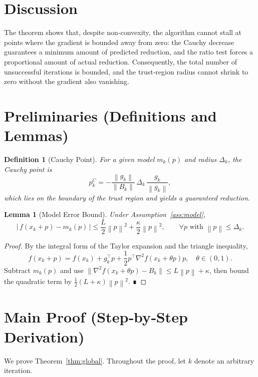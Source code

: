 \documentclass{article}
\newtheorem{lemma}{Lemma}
\newtheorem{definition}{Definition}
\newcommand{\norm}[1]{\left\lVert#1\right\rVert}
\begin{document}
\section*{Discussion}
The theorem shows that, despite non‑convexity, the algorithm cannot
stall at points where the gradient is bounded away from zero: the Cauchy
decrease guarantees a minimum amount of predicted reduction, and the
ratio test forces a proportional amount of actual reduction.  Consequently,
the total number of unsuccessful iterations is bounded, and the
trust‑region radius cannot shrink to zero without the gradient also
vanishing.

\section*{Preliminaries (Definitions and Lemmas)}
\begin{definition}[Cauchy Point]
For a given model $m_k(p)$ and radius $\Delta_k$, the Cauchy point is
\[
p_k^{C}= -\frac{\norm{g_k}}{\|B_k\|}\,\Delta_k\,\frac{g_k}{\norm{g_k}},
\]
which lies on the boundary of the trust region and yields a guaranteed
reduction.
\end{definition}
\begin{lemma}[Model Error Bound]
\label{lem:modelerror}
Under Assumption~\ref{ass:model},
\[
\big|\,f(x_k+p)-m_k(p)\,\big|\le \frac{L}{2}\norm{p}^{2}
      +\frac{\kappa}{2}\norm{p}^{2},
      \qquad\forall p\text{ with }\norm{p}\le\Delta_k .
\]
\end{lemma}
\begin{proof}
By the integral form of the Taylor expansion and the triangle inequality,
\[
f(x_k+p)=f(x_k)+g_k^{\top}p+\frac12p^{\top}\nabla^{2}f(x_k+\theta p)p,
\quad\theta\in(0,1).
\]
Subtract $m_k(p)$ and use $\| \nabla^{2}f(x_k+\theta p)-B_k\|
\le L\norm{p}+\kappa$, then bound the quadratic term by
$\tfrac12(L+\kappa)\norm{p}^{2}$.  ∎
\end{proof}

\section*{Main Proof (Step‑by‑Step Derivation)}
We prove Theorem~\ref{thm:global}.  Throughout the proof,
let $k$ denote an arbitrary iteration.
\end{document}
